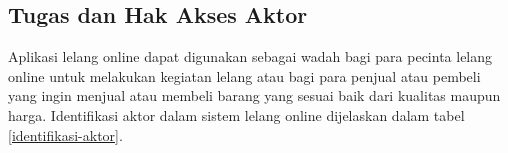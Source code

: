 \subsection{Tugas dan Hak Akses Aktor}
	\label{identifikasi_pengguna}

	\indent Aplikasi lelang online dapat digunakan sebagai wadah bagi para pecinta lelang online untuk melakukan kegiatan lelang atau bagi para penjual atau pembeli yang ingin menjual atau membeli barang yang sesuai baik dari kualitas maupun harga. Identifikasi aktor dalam sistem lelang online dijelaskan dalam tabel \ref{identifikasi-aktor}.
	
	
	
	
	 
